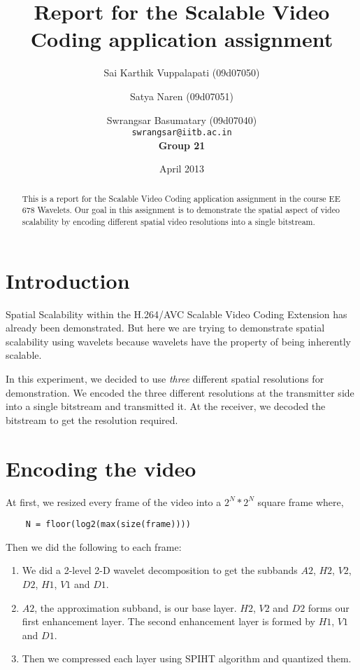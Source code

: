 \documentclass[12pt]{article}
\title{Report for the Scalable Video Coding application assignment}
\author{Sai Karthik Vuppalapati (09d07050) \and Satya Naren (09d07051) \and Swrangsar Basumatary (09d07040) \\
\texttt{swrangsar@iitb.ac.in} \\
\textbf{Group 21}}
\date{April 2013}
\begin{document}
\maketitle

\begin{abstract}
    This is a report for the Scalable Video Coding application assignment in the course EE 678 Wavelets. Our goal in this assignment is to demonstrate the spatial aspect of video scalability by encoding different spatial video resolutions into a single bitstream.
\end{abstract}

\section{Introduction}

Spatial Scalability within the H.264/AVC Scalable Video Coding Extension has already been demonstrated\cite{segall2007}. But here we are trying to demonstrate spatial scalability using wavelets because wavelets have the property of being inherently scalable.

In this experiment, we decided to use \emph{three} different spatial resolutions for demonstration. We encoded the three different resolutions at the transmitter side into a single bitstream and transmitted it. At the receiver, we decoded the bitstream to get the resolution required.

\section{Encoding the video}

At first, we resized every frame of the video into a $2^N * 2^N$ square frame where,
\begin{verbatim}
    N = floor(log2(max(size(frame))))
\end{verbatim}

Then we did the following to each frame:
\begin{enumerate}
    \item We did a 2-level 2-D wavelet decomposition to get the subbands $A2$, $H2$, $V2$, $D2$, $H1$, $V1$ and $D1$.
    \item $A2$, the approximation subband, is our base layer. $H2$, $V2$ and $D2$ forms our first enhancement layer. The second enhancement layer is formed by $H1$, $V1$ and $D1$.
    \item Then we compressed each layer using SPIHT\cite{amirSaid1996} algorithm and quantized them.
\end{enumerate}
\end{document}
